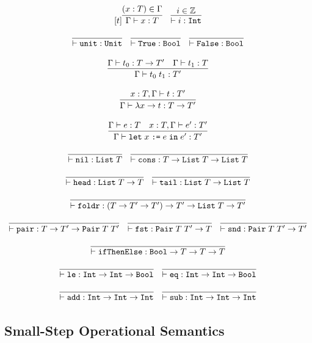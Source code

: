 \documentclass[10pt]{article}
\begin{document}
\[
  \begin{array}{c}[t]
    \infer{\Gamma \vdash x : T}{(x : T) \in \Gamma}
    ~~~
    \infer{\vdash i : \ttt{Int}}{i \in \mathbb{Z}}
    \\\\
    \infer{\vdash \ttt{unit} : \ttt{Unit}}{}
    ~~~
    \infer{\vdash \ttt{True} : \ttt{Bool}}{}
    ~~~
    \infer{\vdash \ttt{False} : \ttt{Bool}}{}
    \\\\
    \infer{\Gamma \vdash t_0\; t_1 : T'}{\Gamma \vdash t_0 : T \ra T' & \Gamma \vdash t_1 : T}
    \\\\
    \infer{\Gamma \vdash \lambda x \ra t : T \ra T'}{x : T, \Gamma \vdash t : T'}
    \\\\
    \infer{\Gamma \vdash \letbnd\; x\; \ttt{:=}\; e\; \inexpr\; e' : T'}{\Gamma \vdash e : T & x : T, \Gamma \vdash e' : T'}
    \\\\
    \infer{\vdash \ttt{nil} : \List\; T}{}
    ~~~
    \infer{\vdash \ttt{cons} : T \ra \List\; T \ra \List\; T}{}
    \\\\
    \infer{\vdash \ttt{head} : \List\; T \ra T}{}
    ~~~
    \infer{\vdash \ttt{tail} : \List\; T \ra \List\; T}{}
    \\\\
    \infer{\vdash \ttt{foldr} : (T \ra T' \ra T') \ra T' \ra \List\; T \ra T'}{}
    \\\\
    \infer{\vdash \ttt{pair} : T \ra T' \ra \tyPair\; T\; T'}{}
    ~~~
    \infer{\vdash \ttt{fst} : \tyPair\; T\; T' \ra T}{}
    ~~~
    \infer{\vdash \ttt{snd} : \tyPair\; T\; T' \ra T'}{}
    \\\\
    \infer{\vdash \ttt{ifThenElse} : \Bool \ra T \ra T \ra T}{}
    \\\\
    \infer{\vdash \ttt{le} : \Int \ra \Int \ra \Bool}{}
    ~~~
    \infer{\vdash \ttt{eq} : \Int \ra \Int \ra \Bool}{}
    \\\\
    \infer{\vdash \ttt{add} : \Int \ra \Int \ra \Int}{}
    ~~~
    \infer{\vdash \ttt{sub} : \Int \ra \Int \ra \Int}{}
  \end{array}
\]

\subsection{Small-Step Operational Semantics}
\end{document}

